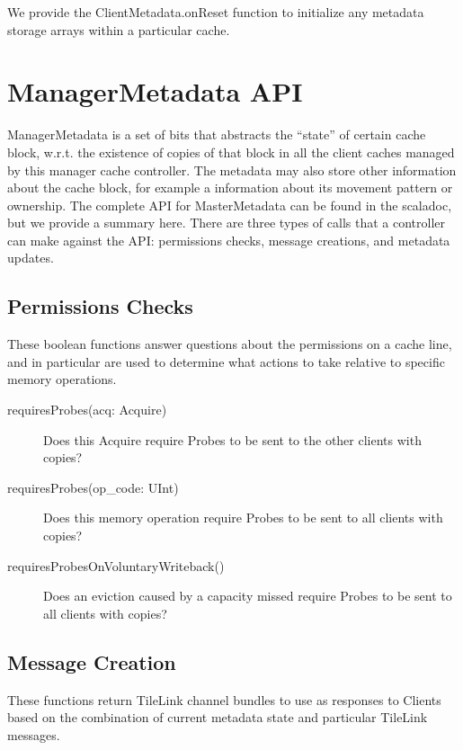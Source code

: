 We provide the ClientMetadata.onReset function to initialize any metadata storage arrays within a particular cache.

\section{ManagerMetadata API} 

ManagerMetadata is a set of bits that abstracts the “state” of certain cache block,
w.r.t. the existence of copies of that block in all the client caches
managed by this manager cache controller.
The metadata may also store other information about the cache block,
for example a information about its movement pattern or ownership.
The complete API for MasterMetadata can be found in the scaladoc,
but we provide a summary here.
There are three types of calls that a controller can make against the API:
permissions checks, message creations, and metadata updates.

\subsection{Permissions Checks}

These boolean functions answer questions about the permissions on a cache line, and in particular are used to determine what actions to take relative to specific memory operations.

\begin{description}
\item[requiresProbes(acq: Acquire) ]
Does this Acquire require Probes to be sent to the other clients with copies?
\item[requiresProbes(op\_code: UInt) ]
Does this memory operation require Probes to be sent to all clients with copies?
\item[requiresProbesOnVoluntaryWriteback() ]
 Does an eviction caused by a capacity missed require Probes to be sent to all clients with copies?
\end{description}

\subsection{Message Creation}

These functions return TileLink channel bundles to use as responses to Clients based on the combination of current metadata state and particular TileLink messages.

